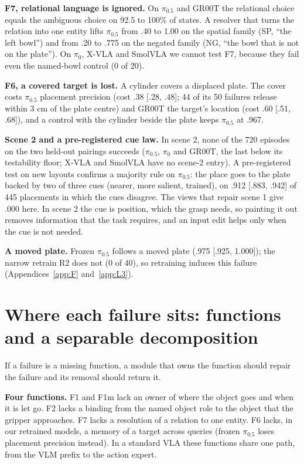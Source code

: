 \documentclass{article}
\newcommand{\pifive}{$\pi_{0.5}$}
\newcommand{\pizero}{$\pi_0$}
\begin{document}
\textbf{F7, relational language is ignored.} On \pifive{} and GR00T the relational choice equals the ambiguous choice on 92.5 to 100\% of states. A resolver that turns the relation into one entity lifts \pifive{} from .40 to 1.00 on the spatial family (SP, ``the left bowl'') and from .20 to .775 on the negated family (NG, ``the bowl that is not on the plate''). On \pizero, X-VLA and SmolVLA we cannot test F7, because they fail even the named-bowl control (0 of 20).

\textbf{F6, a covered target is lost.} A cylinder covers a displaced plate. The cover costs \pifive{} placement precision (cost .38 [.28, .48]; 44 of its 50 failures release within 3 cm of the plate centre) and GR00T the target's location (cost .60 [.51, .68]), and a control with the cylinder beside the plate keeps \pifive{} at .967.

\textbf{Scene 2 and a pre-registered cue law.} In scene 2, none of the 720 episodes on the two held-out pairings succeeds (\pifive, \pizero{} and GR00T, the last below its testability floor; X-VLA and SmolVLA have no scene-2 entry). A pre-registered test on new layouts confirms a majority rule on \pifive: the place goes to the plate backed by two of three cues (nearer, more salient, trained), on .912 [.883, .942] of 445 placements in which the cues disagree. The views that repair scene 1 give .000 here. In scene 2 the cue is position, which the grasp needs, so painting it out removes information that the task requires, and an input edit helps only when the cue is not needed.

\textbf{A moved plate.} Frozen \pifive{} follows a moved plate (.975 [.925, 1.000]); the narrow retrain R2 does not (0 of 40), so retraining induces this failure (Appendices~\ref{app:F} and~\ref{app:L3}).

\section{Where each failure sits: functions and a separable decomposition}
\label{sec:functions}

If a failure is a missing function, a module that owns the function should repair the failure and its removal should return it.

\textbf{Four functions.} F1 and F1m lack an owner of where the object goes and when it is let go. F2 lacks a binding from the named object role to the object that the gripper approaches. F7 lacks a resolution of a relation to one entity. F6 lacks, in our retrained models, a memory of a target across queries (frozen \pifive{} loses placement precision instead). In a standard VLA these functions share one path, from the VLM prefix to the action expert.
\end{document}
